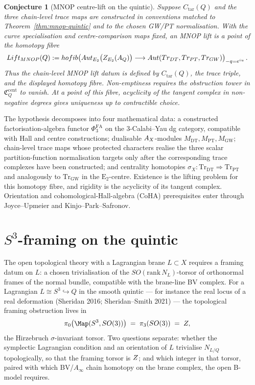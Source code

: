 \documentclass[12pt]{amsart}
\newtheorem{conj}[thm]{Conjecture}
\theoremstyle{remark}
\providecommand{\E}{\mathrm{E}}
\providecommand{\PhiFA}{\Phi^{\mathrm{FA}}}
\providecommand{\DT}{\mathrm{DT}}
\providecommand{\PT}{\mathrm{PT}}
\providecommand{\GW}{\mathrm{GW}}
\providecommand{\Aut}{\mathrm{Aut}}
\begin{document}
\begin{conj}[MNOP centre-lift on the quintic]
  \label{conj:mnop-centre-lift}
  Suppose \(C_{\mathrm{tar}}(Q)\) and the three chain-level trace maps
  are constructed in conventions matched to
  Theorem~\ref{thm:mnop-quintic} and to the chosen GW/PT normalisation.
  With the curve specialisation and centre-comparison maps fixed, an
  MNOP lift is a point of the homotopy fibre
  \[
    \mathrm{Lift}_{\mathrm{MNOP}}(Q):=
    \operatorname{hofib}\!\left(
      \Aut_{\E_2}\bigl(Z_{\E_2}(\cA_Q)\bigr)
      \longrightarrow
      \Aut(\mathrm{Tr}_{\DT},\mathrm{Tr}_{\PT},\mathrm{Tr}_{\GW})
    \right)_{-q=e^{iu}} .
  \]
  Thus the chain-level MNOP lift datum is defined by
  \(C_{\mathrm{tar}}(Q)\), the trace triple, and the displayed
  homotopy fibre.  Non-emptiness requires the obstruction tower in
  \(\mathfrak C^{\mathrm{cent}}_Q\) to vanish.  At a point of this
  fibre, acyclicity of the tangent complex in non-negative degrees gives
  uniqueness up to contractible choice.
\end{conj}

The hypothesis decomposes into four mathematical data: a constructed
factorisation-algebra functor \(\PhiFA_3\) on the 3-Calabi--Yau dg
category, compatible with Hall and centre constructions; dualisable
\(A_X\)-modules \(M_{\DT},M_{\PT},M_{\GW}\); chain-level trace maps
whose protected characters realise the three scalar partition-function
normalisation targets only after the corresponding trace complexes have
been constructed; and centrality homotopies
\(\sigma_X\colon\mathrm{Tr}_{\DT}\Rightarrow\mathrm{Tr}_{\PT}\) and
analogously to \(\mathrm{Tr}_{\GW}\) in the \(\E_2\)-centre.  Existence
is the lifting problem for this homotopy fibre, and rigidity is the
acyclicity of its tangent complex.  Orientation and
cohomological-Hall-algebra (CoHA) prerequisites enter through
Joyce--Upmeier and Kinjo--Park--Safronov.

\section{\texorpdfstring{$S^3$-framing on the quintic}{S^3-framing on the quintic}}\label{sec:s3-framing}

The open topological theory with a Lagrangian brane \(L\subset X\)
requires a framing datum on \(L\): a chosen trivialisation of the
\(SO(\mathrm{rank}\, N_L)\)-torsor of orthonormal frames of the normal
bundle, compatible with the brane-line BV complex.
For a Lagrangian \(L\cong S^3\hookrightarrow Q\) in the smooth quintic
--- for instance the real locus of a real deformation (Sheridan 2016;
Sheridan--Smith 2021) --- the topological framing obstruction lives in
\[
  \pi_0\bigl(\Map(S^3,SO(3))\bigr) \;=\; \pi_3(SO(3)) \;=\; \Z,
\]
the Hirzebruch \(\sigma\)-invariant torsor.  Two questions separate:
	whether the symplectic Lagrangian condition and an orientation of \(L\)
	trivialise \(N_{L/Q}\) topologically, so that the framing torsor is
	\(Z\); and which integer in that torsor, paired with which
BV/\(A_\infty\) chain homotopy on the brane complex, the open B-model
requires.
\end{document}
